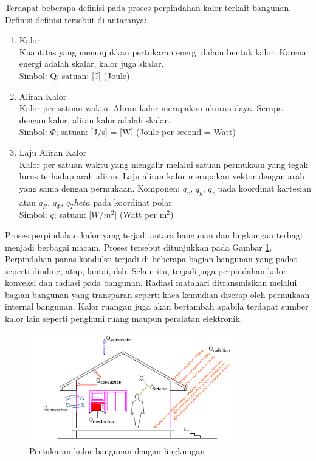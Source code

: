 Terdapat beberapa definisi pada proses perpindahan kalor terkait bangunan. Definisi-definisi tersebut di antaranya: \cite{BuildingPhysics}

\begin{enumerate}
	\item Kalor \\
	Kuantitas yang menunjukkan pertukaran energi dalam bentuk kalor. Karena energi adalah skalar, kalor juga skalar.\\
	Simbol: Q; satuan: [J] (Joule)
	\item Aliran Kalor \\
	Kalor per satuan waktu. Aliran kalor merupakan ukuran daya. Serupa dengan kalor, aliran kalor adalah skalar.\\
	Simbol: $\Phi$; satuan: [J/s] = [W] (Joule per second = Watt)
	\item Laju Aliran Kalor \\
	Kalor per satuan waktu yang mengalir melalui satuan permukaan yang tegak lurus terhadap arah aliran. Laju aliran kalor merupakan vektor dengan arah yang sama dengan permukaan. Komponen: $q_x$, $q_y$, $q_z$ pada koordinat kartesian atau $q_R$, $q_\Phi$, $q_Theta$ pada koordinat polar.\\
	Simbol: $q$; satuan: [$W/m^2$] (Watt per m$^2$)
\end{enumerate}

Proses perpindahan kalor yang terjadi antara bangunan dan lingkungan terbagi menjadi berbagai macam. Proses tersebut ditunjukkan pada Gambar \ref{fig:3:HeatTransferProcess}. Perpindahan panas konduksi terjadi di beberapa bagian bangunan yang padat seperti dinding, atap, lantai, dsb. Selain itu, terjadi juga perpindahan kalor konveksi dan radiasi pada bangunan. Radiasi matahari ditransmisikan melalui bagian bangunan yang transparan seperti kaca kemudian diserap oleh permukaan internal bangunan. Kalor ruangan juga akan bertambah apabila terdapat sumber kalor lain seperti penghuni ruang maupun peralatan elektronik. \cite{skripsiIchfan}

\begin{figure}[!h]
	\centering
	\includegraphics[width=0.8\textwidth]{figures/HeatTransferProcess}
	\caption{Pertukaran kalor bangunan dengan lingkungan \cite{skripsiIchfan}}
	\label{fig:3:HeatTransferProcess}
\end{figure}

